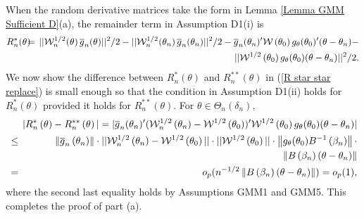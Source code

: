 \documentclass[12pt,thmsb,titlepage,final,oneside,letterpaper]{article}
\begin{document}
When the random derivative matrices take the form in Lemma \ref{Lemma GMM
Sufficient D}(a), the remainder term in Assumption D1(i) is%
\begin{eqnarray}
R_{n}^{\ast }(\theta )\hspace{-0.08in} &=&\hspace{-0.08in}||\mathcal{W}%
_{n}^{1/2}\hspace{-0.02in}\left( \theta \right) \overline{g}_{n}(\theta
)||^{2}/2-||\mathcal{W}_{n}^{1/2}\hspace{-0.02in}\left( \theta _{n}\right) 
\overline{g}_{n}(\theta _{n})||^{2}/2-\overline{g}_{n}(\theta _{n})^{\prime }%
\mathcal{W}\left( \theta _{0}\right) g_{\theta }(\theta _{0})^{\prime
}(\theta -\theta _{n})-  \notag \\
&&\hspace{-0.08in}||\mathcal{W}^{1/2}\left( \theta _{0}\right) g_{\theta
}(\theta _{0})(\theta -\theta _{n})||^{2}/2.
\end{eqnarray}%
We now show the difference between $R_{n}^{\ast }\left( \theta \right) $ and 
$R_{n}^{\ast \ast }\left( \theta \right) $ in (\ref{R star star replace}) is
small enough so that the condition in Assumption D1(ii) holds for $%
R_{n}^{\ast }\left( \theta \right) $ provided it holds for $R_{n}^{\ast \ast
}\left( \theta \right) .$ For $\theta \in \Theta _{n}(\delta _{n}),$%
\begin{eqnarray}
&&\hspace{-0.08in}|R_{n}^{\ast }\left( \theta \right) -R_{n}^{\ast \ast
}\left( \theta \right) |\overset{}{=}|\overline{g}_{n}(\theta _{n})^{\prime
}(\mathcal{W}_{n}^{1/2}\left( \theta _{n}\right) -\mathcal{W}^{1/2}\left(
\theta _{0}\right) )^{\prime }\mathcal{W}^{1/2}\left( \theta _{0}\right)
g_{\theta }(\theta _{0})(\theta -\theta _{n})|  \notag \\
&\leq &\hspace{-0.08in}\left\Vert \overline{g}_{n}\left( \theta _{n}\right)
\right\Vert \cdot ||\mathcal{W}_{n}^{1/2}\left( \theta _{n}\right) -\mathcal{%
W}^{1/2}\left( \theta _{0}\right) ||\cdot ||\mathcal{W}^{1/2}\left( \theta
_{0}\right) ||\cdot \left\Vert g_{\theta }(\theta _{0})B^{-1}\left( \beta
_{n}\right) \right\Vert \cdot  \notag \\
&&\hspace{-0.08in}\left\Vert B\left( \beta _{n}\right) \left( \theta -\theta
_{n}\right) \right\Vert  \notag \\
&=&\hspace{-0.08in}o_{p}(n^{-1/2}\left\Vert B\left( \beta _{n}\right) \left(
\theta -\theta _{n}\right) \right\Vert )=o_{p}(1),
\end{eqnarray}%
where the second last equality holds by Assumptions GMM1 and GMM5. This
completes the proof of part (a).
\end{document}

